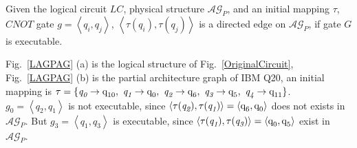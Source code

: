 \documentclass[runningheads]{llncs}
\begin{document}
Given the logical circuit $LC$, physical structure $\mathcal{AG}_{P}$, 
and an initial mapping $\tau$, $CNOT$ gate $g=\left \langle \textit{q}_\textit{i},\textit{q}_\textit{j}\right \rangle $, 
$\left \langle\tau(\textit{q}_\textit{i}),\tau(\textit{q}_\textit{j})\right \rangle $ 
is a directed edge on $\mathcal{AG}_{P}$, if gate $G$ is executable.

\begin{example}
	Fig.~\ref{LAGPAG} (a) is the logical structure of Fig.~\ref{OriginalCircuit}, 
	Fig.~\ref{LAGPAG} (b) is the partial architecture graph of IBM Q20, an initial mapping is 
	$\tau=\{\textit{q}_\textit{0}\rightarrow  \textup{q}_{\textup{10}},\ \textit{q}_\textit{1}\rightarrow \textup{q}_{\textup{0}},\ 
	\textit{q}_\textit{2}\rightarrow  \textup{q}_{\textup{6}},\ \textit{q}_\textit{3}\rightarrow  \textup{q}_{\textup{5}},\ \textit{q}_\textit{4}\rightarrow  \textup{q}_{\textup{11}}\}$.
	$g_{0}=\left \langle \textit{q}_\textit{2},\textit{q}_\textit{1}\right \rangle $ is not executable, since 
	$\left \langle \tau(\textit{q}_\textit{2}),\tau(\textit{q}_\textit{1})\right \rangle =\left \langle \textup{q}_{\textup{6}},\textup{q}_{\textup{0}}\right \rangle $ does not  exists in $\mathcal{AG}_{P}$.
	But $g_{3}=\left \langle \textit{q}_\textit{1},\textit{q}_\textit{3}\right \rangle $ is executable, since 
	$\left \langle \tau(\textit{q}_\textit{1}),\tau(\textit{q}_\textit{3})\right \rangle =\left \langle \textup{q}_{\textup{0}},\textup{q}_{\textup{5}}\right \rangle $  exist in $\mathcal{AG}_{P}$.
\end{example}
\end{document}
